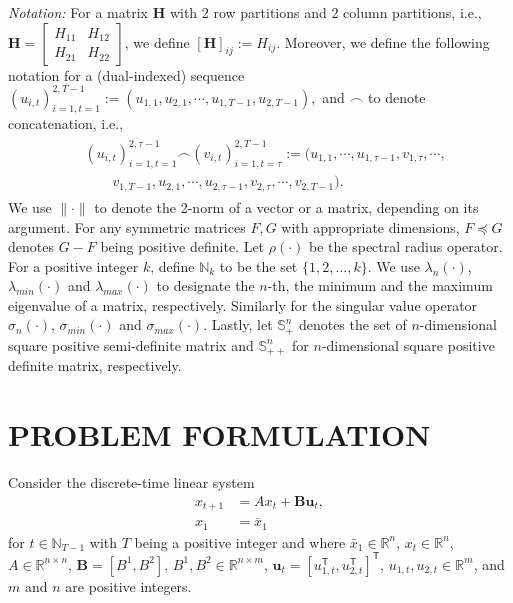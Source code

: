 \documentclass[letterpaper, 10 pt, conference]{ieeeconf}  %
\newcommand{\transpose}{\mathsf{T}}
\begin{document}
\emph{Notation:}
For a matrix $\mathbf{H}$ with 2 row partitions and 2 column partitions, i.e.,
    $\mathbf{H} = 
    \begin{bmatrix}
        H_{11} & H_{12}\\
        H_{21} & H_{22}
    \end{bmatrix}$,
we define
    $[\mathbf{H}]_{ij} := H_{ij}$.
Moreover, we define the following notation for a (dual-indexed) sequence
$(u_{i,t})_{i=1,t=1}^{2,T-1} := (u_{1,1},u_{2,1},\cdots, u_{1,T-1},u_{2,T-1}),
$
and $\frown$ to denote concatenation, i.e.,
\begin{align*}
    \begin{split}
    &(u_{i,t})_{i=1,t=1}^{2,\tau-1} \frown (v_{i,t})_{i=1,t=\tau}^{2,T-1}:=(u_{1,1},\cdots,u_{1,\tau-1},v_{1,\tau},\cdots,\\
    &\qquad v_{1,T-1},u_{2,1},\cdots,u_{2,\tau-1},v_{2,\tau},\cdots,v_{2,T-1} ).
    \end{split}
\end{align*}
We use $\|\cdot\|$ to denote the 2-norm of a vector or a matrix, depending on its argument. For any symmetric matrices $F,G$ with appropriate dimensions, $F \preceq G$ denotes $G-F$ being positive definite. Let $\rho(\cdot)$ be the spectral radius operator. For a positive integer $k$, define $\mathbb{N}_k$ to be the set $\{1,2,\dots,k\}$. We use $\lambda_{n}(\cdot)$, $\lambda_{min}(\cdot)$ and $\lambda_{max}(\cdot)$ to designate the $n$-th, the minimum and the maximum eigenvalue of a matrix, respectively. Similarly for the singular value operator $\sigma_{n}(\cdot)$, $\sigma_{min}(\cdot)$ and $\sigma_{max}(\cdot)$. Lastly, let $\mathbb{S}_{+}^{n}$ denotes the set of $n$-dimensional square positive semi-definite matrix and $\mathbb{S}_{++}^{n}$ for $n$-dimensional square positive definite matrix, respectively.

\section{PROBLEM FORMULATION}
\label{sec:problem_formulation}

Consider the discrete-time linear system
\begin{align}
    x_{t+1} &= Ax_{t} + \mathbf{B}\mathbf{u}_{t}\label{eq:linsys},\\
    x_{1} &=\bar{x}_{1} \label{eq:initialx}
\end{align}
for $t \in \mathbb{N}_{T-1}$ with $T$ being a positive integer and where $\bar{x}_1 \in \mathbb{R}^{n}$, $x_{t}\in\mathbb{R}^n$, $A \in \mathbb{R}^{n\times n}$, $\mathbf{B} = [B^{1}, B^{2}]$, $B^{1},B^{2} \in \mathbb{R}^{n\times m}$, $\mathbf{u}_{t} = [u_{1,t}^{\transpose}, u_{2,t}^{\transpose}]^{\transpose}$, $u_{1,t}, u_{2,t} \in \mathbb{R}^{m}$, and $m$ and $n$ are positive integers.
\end{document}
